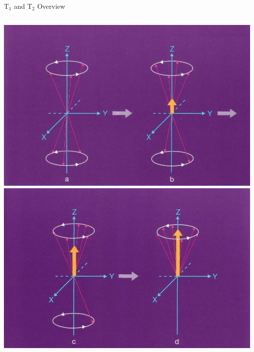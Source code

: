 \documentclass[aspectratio=169,xcolor=dvipsnames]{beamer}
\begin{document}
\begin{frame}{T$_{1}$ and T$_{2}$ Overview}
\begin{columns}[c]
\includegraphics[width=1\textwidth]{imgs/longrelax}
\includegraphics[width=1\textwidth]{imgs/longrelax2}
\end{columns}

\end{frame}

\end{document}

